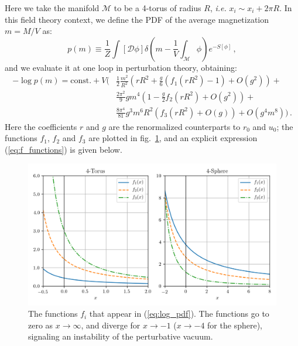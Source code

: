 \documentclass[11pt,a4paper]{article}
\begin{document}
Here we take the manifold $\mathcal{M}$ to be a 4-torus of radius $R$,
\textit{i.e.} $x_i\sim x_i + 2\pi R$. In this field theory context, we define
the PDF of the average magnetization $m = M / V$ as:
\begin{equation}
    \label{eq:pdf_definition}
    p(m) \equiv \frac{1}{Z} \int \left[\mathcal{D}\phi\right]
    \delta\left(m - \frac{1}{V}\int_{\mathcal{M}} \phi\right)
    e^{-S[\phi]}\,,
\end{equation}
and we evaluate it at one loop in perturbation theory, obtaining:
\begin{equation}
\label{eq:log_pdf}
\begin{split}
    -\log p(m) = \mathrm{const.} +  V\Bigg(
  &\frac{1}{2} \frac{m^2}{R^2} \left(
    r R^2 + \frac{g}{6} \left(f_1\left(r R^2\right) - 1\right)
    + O\left(g^2\right)\right) + \\
  & \frac{2\pi^2}{9}gm^4\left(
    1 - \frac{g}{2}f_2\left(r R^2\right)
    + O\left(g^2\right)\right) + \\
  & \frac{8\pi^4}{81} g^3 m^6 R^2\left(
    f_3\left(r R^2\right)
    + O\left(g\right)\right) + O\left(g^4m^8\right) \Bigg)\,.
\end{split}
\end{equation}
Here the coefficients $r$ and $g$ are the renormalized counterparts to $r_0$
and $u_0$; the functions $f_1$, $f_2$ and $f_3$ are plotted in
fig.~\ref{fig:f_functions}, and an explicit expression (\ref{eq:f_functions})
is given below.

\begin{figure}
\begin{center}
\includegraphics[scale=0.75]{f_functions.png}
\end{center}
\caption{\label{fig:f_functions} The functions $f_i$ that appear in
    (\ref{eq:log_pdf}). The functions go to zero as $x\to\infty$, and diverge
    for $x\to-1$ ($x\to-4$ for the sphere), signaling an instability of the
    perturbative vacuum.}
\end{figure}
\end{document}
